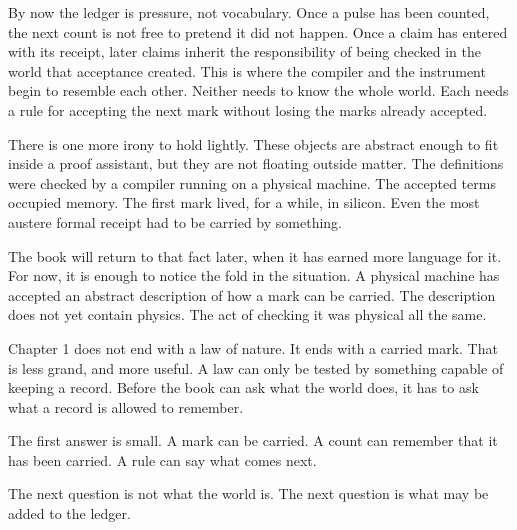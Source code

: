 By now the ledger is pressure, not vocabulary. Once a pulse has been counted,
the next count is not free to pretend it did not happen. Once a claim has
entered with its receipt, later claims inherit the responsibility of being
checked in the world that acceptance created. This is where the compiler and
the instrument begin to resemble each other. Neither needs to know the whole
world. Each needs a rule for accepting the next mark without losing the marks
already accepted.

There is one more irony to hold lightly. These objects are abstract enough to
fit inside a proof assistant, but they are not floating outside matter. The
definitions were checked by a compiler running on a physical machine. The
accepted terms occupied memory. The first mark lived, for a while, in silicon.
Even the most austere formal receipt had to be carried by something.

The book will return to that fact later, when it has earned more language for
it. For now, it is enough to notice the fold in the situation. A physical
machine has accepted an abstract description of how a mark can be carried. The
description does not yet contain physics. The act of checking it was physical
all the same.

Chapter 1 does not end with a law of nature. It ends with a carried mark. That
is less grand, and more useful. A law can only be tested by something capable
of keeping a record. Before the book can ask what the world does, it has to ask
what a record is allowed to remember.

The first answer is small. A mark can be carried. A count can remember that it
has been carried. A rule can say what comes next.

The next question is not what the world is. The next question is what may be
added to the ledger.
